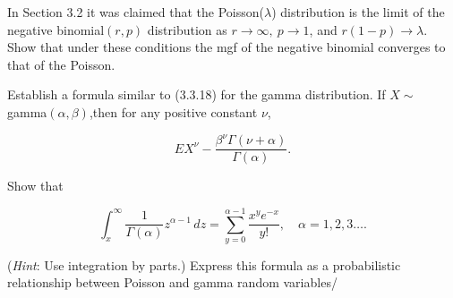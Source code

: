 \documentclass[12pt,letterpaper]{exam}
\begin{document}
\begin{questions}
	
	\begin{solution}
		
	\end{solution}
	
	\question 
	In Section 3.2 it was claimed that the Poisson(\(\lambda\)) distribution is the limit of the negative
	binomial\((r, p)\) distribution as \(r \rightarrow \infty,\ p \rightarrow 1\), and \(r(1-p) \rightarrow \lambda\).
	Show that under these
	conditions the mgf of the negative binomial converges to that of the Poisson.
	
	\begin{solution}
		
	\end{solution}
	
	\setcounter{question}{16}
	\question 
	Establish a formula similar to (3.3.18) for the gamma distribution. 
	If \(X \sim\) gamma\((\alpha,\beta)\),then for any positive constant \(\nu\),
	
	\[EX^\nu - \frac{\beta^\nu \Gamma (\nu+\alpha)}{\Gamma(\alpha)}.\]
	
	\begin{solution}
		
	\end{solution}
	
	\setcounter{question}{18}
	\question 
	Show that
	
	\[
		\int_{x}^{\infty} \frac{1}{\Gamma(\alpha)} z^{\alpha-1} \,dz = 
		\sum_{y=0}^{\alpha-1} \frac{x^y e^{-x}}{y!}, \quad \alpha=1,2,3\ldots.
	\]
	
	(\textit{Hint}: Use integration by parts.) Express this formula as a probabilistic relationship
	between Poisson and gamma random variables/
	

\end{questions}
\end{document}
